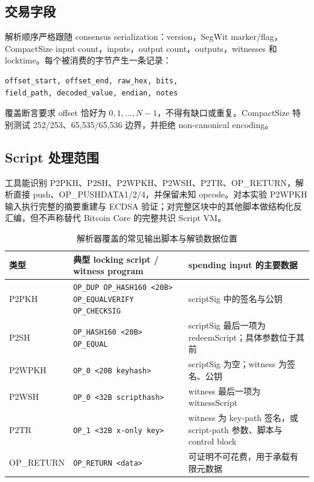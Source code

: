 \documentclass[11pt,a4paper,fontset=none]{ctexart}
\begin{document}
\subsection{交易字段}

解析顺序严格跟随 consensus serialization：version，SegWit marker/flag，CompactSize input count，inputs，output count，outputs，witnesses 和 locktime。每个被消费的字节产生一条记录：

\begin{lstlisting}[language={},caption={逐字节 CSV 数据契约}]
offset_start, offset_end, raw_hex, bits,
field_path, decoded_value, endian, notes
\end{lstlisting}

覆盖断言要求 offset 恰好为 $0,1,\ldots,N-1$，不得有缺口或重复。CompactSize 特别测试 252/253、65,535/65,536 边界，并拒绝 non-canonical encoding。

\subsection{Script 处理范围}

工具能识别 P2PKH、P2SH、P2WPKH、P2WSH、P2TR、OP\_RETURN，解析直接 push、OP\_PUSHDATA1/2/4，并保留未知 opcode。对本实验 P2WPKH 输入执行完整的摘要重建与 ECDSA 验证；对完整区块中的其他脚本做结构化反汇编，但不声称替代 Bitcoin Core 的完整共识 Script VM。

\begin{table}[H]
\centering
\setlength{\tabcolsep}{3pt}
\caption{解析器覆盖的常见输出脚本与解锁数据位置}
\label{tab:script-patterns}
\begin{tabular}{p{}p{}p{}}
\toprule
类型 & 典型 locking script / witness program & spending input 的主要数据 \\
\midrule
P2PKH & \texttt{OP\_DUP OP\_HASH160 <20B> OP\_EQUALVERIFY OP\_CHECKSIG} & scriptSig 中的签名与公钥 \\
P2SH & \texttt{OP\_HASH160 <20B> OP\_EQUAL} & scriptSig 最后一项为 redeemScript；具体参数位于其前 \\
P2WPKH & \texttt{OP\_0 <20B keyhash>} & scriptSig 为空；witness 为签名、公钥 \\
P2WSH & \texttt{OP\_0 <32B scripthash>} & witness 最后一项为 witnessScript \\
P2TR & \texttt{OP\_1 <32B x-only key>} & witness 为 key-path 签名，或 script-path 参数、脚本与 control block \\
OP\_\allowbreak RETURN & \texttt{OP\_RETURN <data>} & 可证明不可花费，用于承载有限元数据 \\
\bottomrule
\end{tabular}
\end{table}
\end{document}
